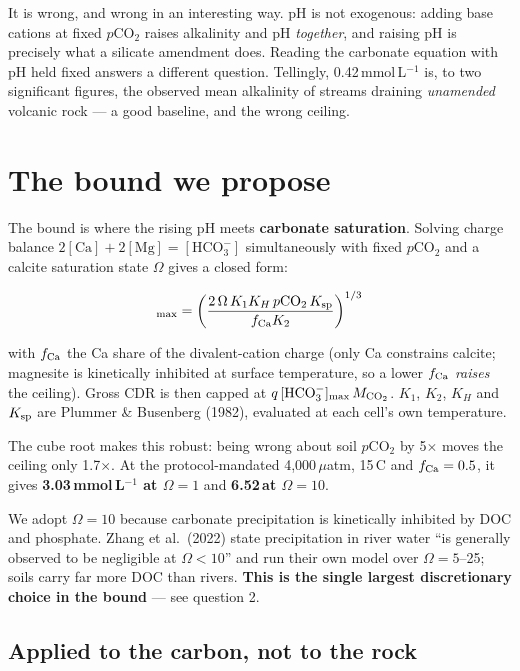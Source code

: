 \documentclass[11pt,a4paper]{article}
\newcommand{\cotwo}{CO$_2$}
\begin{document}
It is wrong, and wrong in an interesting way. pH is not exogenous: adding base
cations at fixed $p$\cotwo{} raises alkalinity and pH \emph{together}, and raising pH
is precisely what a silicate amendment does. Reading the carbonate equation with pH
held fixed answers a different question. Tellingly, 0.42\,mmol\,L$^{-1}$ is, to two
significant figures, the observed mean alkalinity of streams draining
\emph{unamended} volcanic rock --- a good baseline, and the wrong ceiling.

\section{The bound we propose}

The bound is where the rising pH meets \textbf{carbonate saturation}. Solving charge
balance $2[\mathrm{Ca}] + 2[\mathrm{Mg}] = [\mathrm{HCO_3^-}]$ simultaneously with
fixed $p$\cotwo{} and a calcite saturation state $\Omega$ gives a closed form:

\begin{equation}
[\mathrm{HCO_3^-}]_{\max} = \left(
\frac{2\,\Omega\,K_1 K_H\, p\mathrm{CO_2}\, K_{\rm sp}}{f_{\rm Ca} K_2}
\right)^{1/3}
\end{equation}

with $f_{\rm Ca}$ the Ca share of the divalent-cation charge (only Ca constrains
calcite; magnesite is kinetically inhibited at surface temperature, so a lower
$f_{\rm Ca}$ \emph{raises} the ceiling). Gross CDR is then capped at
$q\,[\mathrm{HCO_3^-}]_{\max}\,M_{\rm CO_2}$. $K_1$, $K_2$, $K_H$ and $K_{\rm sp}$
are Plummer \& Busenberg (1982), evaluated at each cell's own temperature.

The cube root makes this robust: being wrong about soil $p$\cotwo{} by 5$\times$ moves
the ceiling only 1.7$\times$. At the protocol-mandated
4,000\,$\mu$atm, 15\,\textdegree C and $f_{\rm Ca} =
0.5$, it gives \textbf{3.03\,mmol\,L$^{-1}$ at $\Omega = 1$}
and \textbf{6.52\,at $\Omega = 10$}.

We adopt $\Omega = 10$ because carbonate
precipitation is kinetically inhibited by DOC and phosphate. Zhang et al.\ (2022)
state precipitation in river water ``is generally observed to be negligible at
$\Omega < 10$'' and run their own model over $\Omega = 5$--25; soils carry far more
DOC than rivers. \textbf{This is the single largest discretionary choice in the
bound} --- see question 2.

\subsection*{Applied to the carbon, not to the rock}
\end{document}
